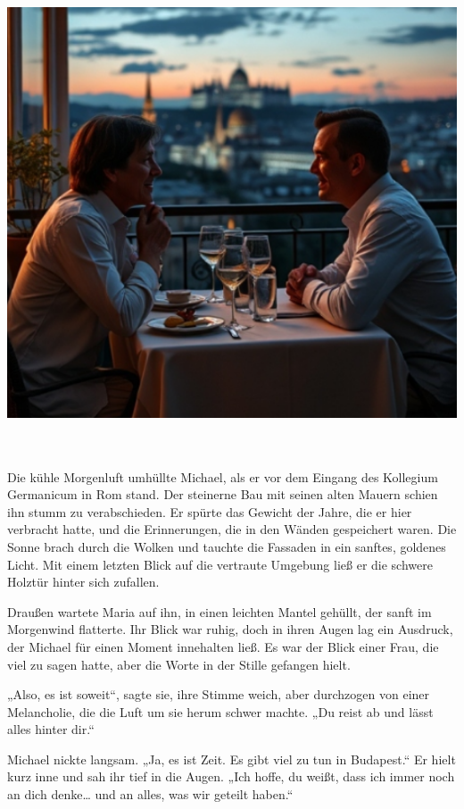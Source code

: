 \documentclass[
]{article}
\begin{document}
\includegraphics[width=6in,height=5.58333in]{media/image008.png}

Die kühle Morgenluft umhüllte Michael, als er vor dem Eingang des
Kollegium Germanicum in Rom stand. Der steinerne Bau mit seinen alten
Mauern schien ihn stumm zu verabschieden. Er spürte das Gewicht der
Jahre, die er hier verbracht hatte, und die Erinnerungen, die in den
Wänden gespeichert waren. Die Sonne brach durch die Wolken und tauchte
die Fassaden in ein sanftes, goldenes Licht. Mit einem letzten Blick auf
die vertraute Umgebung ließ er die schwere Holztür hinter sich zufallen.

Draußen wartete Maria auf ihn, in einen leichten Mantel gehüllt, der
sanft im Morgenwind flatterte. Ihr Blick war ruhig, doch in ihren Augen
lag ein Ausdruck, der Michael für einen Moment innehalten ließ. Es war
der Blick einer Frau, die viel zu sagen hatte, aber die Worte in der
Stille gefangen hielt.

„Also, es ist soweit``, sagte sie, ihre Stimme weich, aber durchzogen
von einer Melancholie, die die Luft um sie herum schwer machte. „Du
reist ab und lässt alles hinter dir.``

Michael nickte langsam. „Ja, es ist Zeit. Es gibt viel zu tun in
Budapest.`` Er hielt kurz inne und sah ihr tief in die Augen. „Ich
hoffe, du weißt, dass ich immer noch an dich denke\ldots{} und an alles,
was wir geteilt haben.``
\end{document}
